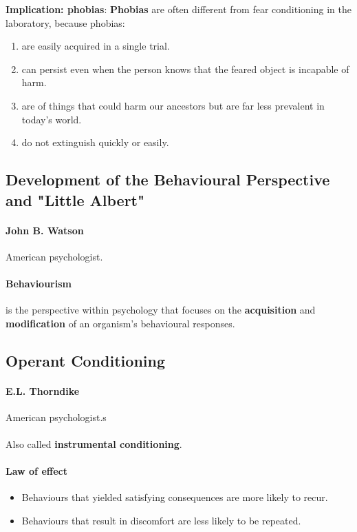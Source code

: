 \documentclass{article}
\begin{document}
	\textbf{Implication: phobias}: \textbf{Phobias} are often different from fear conditioning in the laboratory, because phobias:
	\begin{enumerate}
		\item are easily acquired in a single trial.
		\item can persist even when the person knows that the feared object is incapable of harm.
		\item are of things that could harm our ancestors but are far less prevalent in today's world.
		\item do not extinguish quickly or easily.
	\end{enumerate}
	\subsection{Development of the Behavioural Perspective and "Little Albert"}
	\paragraph{John B. Watson} American psychologist.
	\paragraph{Behaviourism} is the perspective within psychology that focuses on the \textbf{acquisition} and \textbf{modification} of an organism's behavioural responses.
	\subsection{Operant Conditioning}
	\paragraph{E.L. Thorndike} American psychologist.s
	\paragraph{} Also called \textbf{instrumental conditioning}.
	\paragraph{Law of effect}
	\begin{itemize}
		\item Behaviours that yielded satisfying consequences are more likely to recur.
		\item Behaviours that result in discomfort are less likely to be repeated.
	\end{itemize}
\end{document}
